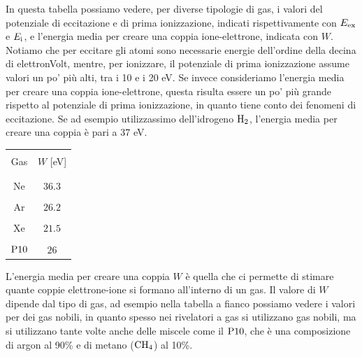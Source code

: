 In questa tabella possiamo vedere, per diverse tipologie di gas, i valori del potenziale di eccitazione e di prima ionizzazione, indicati rispettivamente con $E_{\rm ex}$ e $E_{\rm i}$, e l'energia media per creare una coppia ione-elettrone, indicata con $W$. Notiamo che per eccitare gli atomi sono necessarie energie dell'ordine della decina di elettronVolt, mentre, per ionizzare, il potenziale di prima ionizzazione assume valori un po' più alti, tra i 10 e i 20 eV. Se invece consideriamo l'energia media per creare una coppia ione-elettrone, questa risulta essere un po' più grande rispetto al potenziale di prima ionizzazione, in quanto tiene conto dei fenomeni di eccitazione. Se ad esempio utilizzassimo dell'idrogeno $\rm H_2$, l'energia media per creare una coppia è pari a 37 eV.

\vspace{0.4cm}

\begin{minipage}{0.245\textwidth}
   \begin{center}
      \begin{tabular}{|c|c|}
         \hline
         &\\[-0.4cm]
         Gas & $W$ [eV]\\[0.1mm]
         &\\[-0.4cm]
         \hline
         &\\[-0.4cm]
         Ne & $36.3$\\[0.1mm]
         \hline
         &\\[-0.4cm]
         Ar & $26.2$\\[0.1mm]
         \hline
         &\\[-0.4cm]
         Xe & $21.5$\\[0.1mm]
         \hline
         &\\[-0.4cm]
         $\rm P10$ & $26$\\[0.1mm]
         \hline
      \end{tabular}
   \end{center}
\end{minipage}
\begin{minipage}{0.75\textwidth}
   \vspace{0.1cm}L'energia media per creare una coppia $W$ è quella che ci permette di stimare quante coppie elettrone-ione si formano all'interno di un gas. Il valore di $W$ dipende dal tipo di gas, ad esempio nella tabella a fianco possiamo vedere i valori per dei gas nobili, in quanto spesso nei rivelatori a gas si utilizzano gas nobili, ma si utilizzano tante volte anche delle miscele come il $\rm P10$, che è una composizione di argon al 90\% e di metano ($\rm CH_4$) al 10\%.
\end{minipage}

